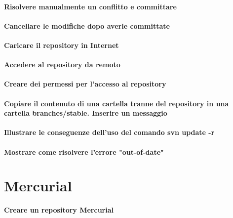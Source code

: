 \documentclass[a4paper]{article}
\begin{document}
	\paragraph{Risolvere manualmente un conflitto e committare}
	
	\paragraph{Cancellare le modifiche dopo averle committate}
	
	\paragraph{Caricare il repository in Internet}
	
	\paragraph{Accedere al repository da remoto}
	
	\paragraph{Creare dei permessi per l'accesso al repository}
	
	\paragraph{Copiare il contenuto di una cartella tranne del repository in una cartella branches/stable. Inserire un messaggio}

	\paragraph{Illustrare le conseguenze dell'uso del comando svn update -r}
	
	\paragraph{Mostrare come risolvere l'errore "out-of-date"}	
	

	
	\section{Mercurial} %
	
		\paragraph{Creare un repository Mercurial}
		
\end{document}
